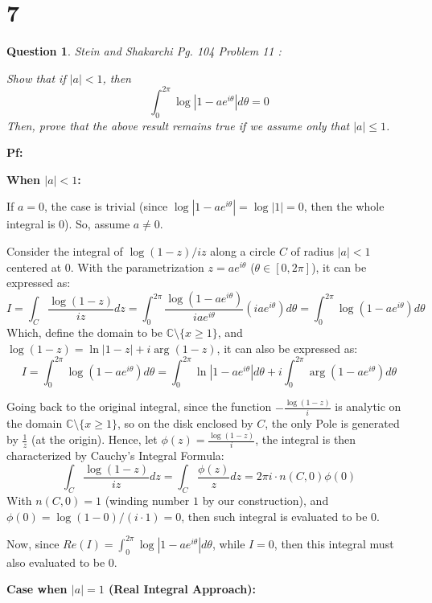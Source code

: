\documentclass{article}
\newtheorem{question}{Question}
\begin{document}
\section*{7}
\begin{myBox}[]{}
    \begin{question} Stein and Shakarchi Pg. 104 Problem 11
        :

        Show that if $|a|<1$, then
        $$\int_{0}^{2\pi}\log|1-ae^{i\theta}|d\theta =0$$
        Then, prove that the above result remains true if we assume only that $|a|\leq 1$.
    \end{question}
\end{myBox}

\textbf{Pf:}

\textbf{When $|a|<1$:}

If $a=0$, the case is trivial (since $\log|1-ae^{i\theta}| = \log|1|=0$, then the whole integral is $0$). So, assume $a\neq 0$.

\hfil

Consider the integral of $\log(1-z)/iz$ along a circle $C$ of radius $|a|<1$ centered at $0$. With the parametrization $z=ae^{i\theta}$ ($\theta\in [0,2\pi]$), it can be expressed as:
$$I=\int_{C}\frac{\log(1-z)}{iz}dz = \int_{0}^{2\pi}\frac{\log(1-ae^{i\theta})}{iae^{i\theta}}(iae^{i\theta})d\theta = \int_{0}^{2\pi}\log(1-ae^{i\theta})d\theta$$
Which, define the domain to be $\mathbb{C}\setminus\{x\geq 1\}$, and $\log(1-z)=\ln|1-z|+i\arg(1-z)$, it can also be expressed as:
$$I= \int_{0}^{2\pi}\log(1-ae^{i\theta})d\theta=\int_{0}^{2\pi}\ln|1-ae^{i\theta}|d\theta + i\int_{0}^{2\pi}\arg(1-ae^{i\theta})d\theta$$

Going back to the original integral, since the function $-\frac{\log(1-z)}{i}$ is analytic on the domain $\mathbb{C}\setminus\{x\geq 1\}$, so on the disk enclosed by $C$, the only Pole 
is generated by $\frac{1}{z}$ (at the origin). Hence, let $\phi(z)=\frac{\log(1-z)}{i}$, the integral is then characterized by Cauchy's Integral Formula:
$$\int_{C}\frac{\log(1-z)}{iz}dz = \int_{C}\frac{\phi(z)}{z}dz = 2\pi i\cdot n(C,0)\phi(0)$$
With $n(C,0)=1$ (winding number $1$ by our construction), and $\phi(0)=\log(1-0)/(i\cdot 1)=0$, then such integral is evaluated to be $0$.

Now, since $Re(I) = \int_{0}^{2\pi}\log|1-ae^{i\theta}|d\theta$, while $I=0$, then this integral must also evaluated to be $0$.

\hfil

\textbf{Case when $|a|=1$ (Real Integral Approach):}
\end{document}
